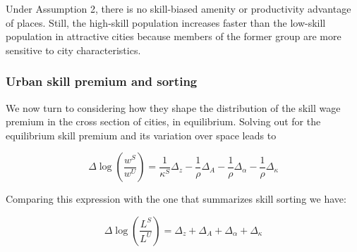 Under Assumption 2, there is no skill-biased amenity or productivity advantage of places. Still, the high-skill population increases faster than the low-skill population in attractive cities because members of the former group are more sensitive to city characteristics. 

\subsubsection{Urban skill premium and sorting}

We now turn to considering how they shape the distribution of the skill wage premium in the cross section of cities, in equilibrium. Solving out for the equilibrium skill premium and its variation over space leads to

\begin{equation}
  \Delta \log(\frac{w^S}{w^U}) = \frac{1}{\kappa^S}\Delta_z - \frac{1}{\rho} \Delta_A - \frac{1}{\rho} \Delta_{\alpha} - \frac{1}{\rho} \Delta_{\kappa}
\end{equation}

Comparing this expression with the one that summarizes skill sorting we have:

\begin{equation*}
  \Delta \log(\frac{L^S}{L^U}) = \Delta_z + \Delta_A + \Delta_{\alpha} + \Delta_{\kappa}
\end{equation*}




